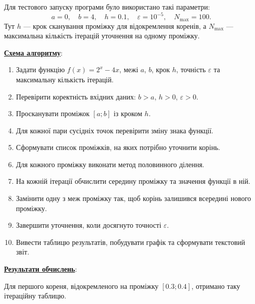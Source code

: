 \documentclass[12pt,a4paper]{article}
\begin{document}
    Для тестового запуску програми було використано такі параметри:
    \[
        a = 0,\quad b = 4,\quad h = 0.1,\quad \varepsilon = 10^{-5},\quad N_{\max}=100.
    \]
    Тут $h$ --- крок сканування проміжку для відокремлення коренів, а $N_{\max}$ --- максимальна
    кількість ітерацій уточнення на одному проміжку.

    \vspace{1em}

    \noindent
    \textbf{\underline{Схема алгоритму}}:

    \begin{enumerate}
        \item Задати функцію $f(x)=2^x-4x$, межі $a$, $b$, крок $h$, точність $\varepsilon$ та
        максимальну кількість ітерацій.
        \item Перевірити коректність вхідних даних: $b>a$, $h>0$, $\varepsilon>0$.
        \item Просканувати проміжок $[a;b]$ із кроком $h$.
        \item Для кожної пари сусідніх точок перевірити зміну знака функції.
        \item Сформувати список проміжків, на яких потрібно уточнити корінь.
        \item Для кожного проміжку виконати метод половинного ділення.
        \item На кожній ітерації обчислити середину проміжку та значення функції в ній.
        \item Замінити одну з меж проміжку так, щоб корінь залишився всередині нового проміжку.
        \item Завершити уточнення, коли досягнуто точності $\varepsilon$.
        \item Вивести таблицю результатів, побудувати графік та сформувати текстовий звіт.
    \end{enumerate}

    \vspace{1em}

    \textbf{\underline{Результати обчислень}}:

    Для першого кореня, відокремленого на проміжку $[0.3;0.4]$, отримано таку ітераційну таблицю.
\end{document}
